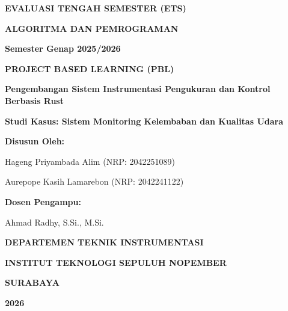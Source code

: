 \documentclass[12pt, a4paper]{article}
\begin{document}
\begin{titlepage}
    \centering
    \vspace*{1cm}
    
    {\Large \bfseries EVALUASI TENGAH SEMESTER (ETS) \par}
    {\Large \bfseries ALGORITMA DAN PEMROGRAMAN \par}
    \vspace{0.5cm}
    {\large \bfseries Semester Genap 2025/2026 \par}
    
    \vspace{2cm}
    
    {\Large \bfseries PROJECT BASED LEARNING (PBL) \par}
    {\Large \bfseries Pengembangan Sistem Instrumentasi Pengukuran dan Kontrol Berbasis Rust \par}
    \vspace{1cm}
    {\large \bfseries Studi Kasus: Sistem Monitoring Kelembaban dan Kualitas Udara \par}
    
    \vspace{3cm}
    
    \textbf{Disusun Oleh:} \par
    \vspace{0.5cm}
    Hageng Priyambada Alim \hspace{1cm} (NRP: 2042251089) \par 
    Aurepope Kasih Lamarebon \hspace{1cm} (NRP: 2042241122) \par
    
    \vspace{3cm}
    \textbf{Dosen Pengampu:} \par
    Ahmad Radhy, S.Si., M.Si. \par
    
    \vfill
    
    {\large \bfseries DEPARTEMEN TEKNIK INSTRUMENTASI \par}
    {\large \bfseries INSTITUT TEKNOLOGI SEPULUH NOPEMBER \par}
    {\large \bfseries SURABAYA \par}
    {\large \bfseries 2026 \par}
    
\end{titlepage}

\newpage
\tableofcontents
\newpage
\end{document}
